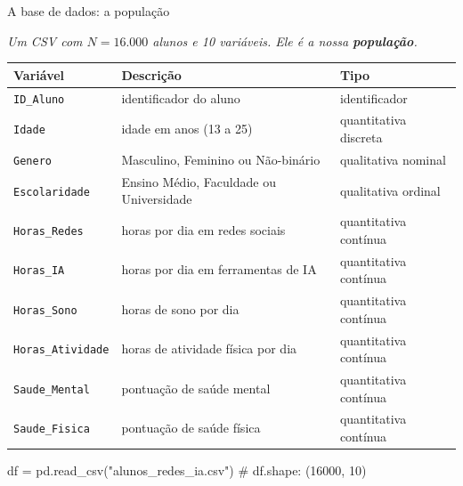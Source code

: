 \documentclass[aspectratio=169, 10pt, t]{beamer}
\newcommand{\code}[1]{\texttt{\color{emascindigo}#1}}
\newcommand{\motive}[1]{\par{\small\itshape\color{softgray}#1}\par\vspace{4pt}}
\begin{document}
\begin{frame}[fragile]{A base de dados: a população}
\motive{Um CSV com $N=16.000$ alunos e 10 variáveis. Ele é a nossa \textbf{população}.}
\renewcommand{\arraystretch}{0.92}
\centering\footnotesize
\begin{tabular}{lll}
\toprule
\textbf{Variável} & \textbf{Descrição} & \textbf{Tipo} \\
\midrule
\code{ID\_Aluno} & identificador do aluno & identificador \\
\code{Idade} & idade em anos (13 a 25) & quantitativa discreta \\
\code{Genero} & Masculino, Feminino ou Não-binário & qualitativa nominal \\
\code{Escolaridade} & Ensino Médio, Faculdade ou Universidade & qualitativa ordinal \\
\code{Horas\_Redes} & horas por dia em redes sociais & quantitativa contínua \\
\code{Horas\_IA} & horas por dia em ferramentas de IA & quantitativa contínua \\
\code{Horas\_Sono} & horas de sono por dia & quantitativa contínua \\
\code{Horas\_Atividade} & horas de atividade física por dia & quantitativa contínua \\
\code{Saude\_Mental} & pontuação de saúde mental & quantitativa contínua \\
\code{Saude\_Fisica} & pontuação de saúde física & quantitativa contínua \\
\bottomrule
\end{tabular}
\begin{pycode}
df = pd.read_csv("alunos_redes_ia.csv")   # df.shape: (16000, 10)
\end{pycode}
\end{frame}
\end{document}

